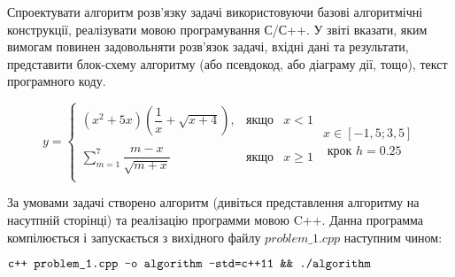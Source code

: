 \begin{center}
  \Large{}
\end{center}

Спроектувати алгоритм розв’язку задачі використовуючи базові алгоритмічні конструкції, реалізувати мовою програмування С/С++. У звіті вказати, яким вимогам повинен задовольняти розв’язок задачі, вхідні дані та результати, представити блок-схему алгоритму (або псевдокод, або діаграму дії, тощо), текст програмного коду.


$$
 y = \left\{
    \begin{array}{lcr}
       (x^2+5x)(\dfrac{1}{x}+\sqrt{x+4}), & \text{якщо} & x < 1 \\
       \\
       \sum_{m=1}^7 \dfrac{m-x}{\sqrt{m+x}} & \text{якщо} & x \geq 1 \\
    \end{array} \begin{array}{l}
    x \in [-1,5;3,5] \\
    {\text{ крок }} h=0.25
    \end{array}
$$


За умовами задачі створено алгоритм (дивіться представлення алгоритму на насутпній сторінці) та реалізацію программи мовою C++. Данна программа компілюється і запускається з вихідного файлу $problem\_1.cpp$ наступним чином:

$\normalsize\texttt{c++ problem\_1.cpp -o algorithm -std=c++11 \&\& ./algorithm}$
